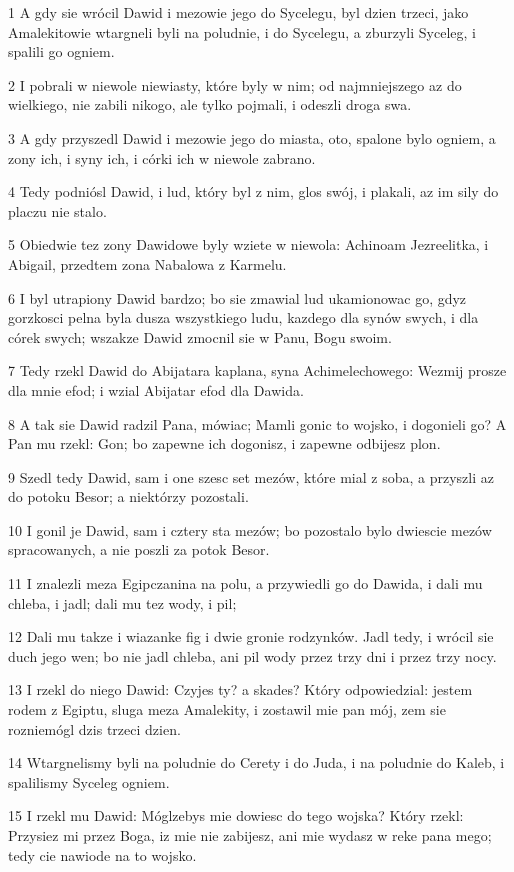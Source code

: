 \par 1 A gdy sie wrócil Dawid i mezowie jego do Sycelegu, byl dzien trzeci, jako Amalekitowie wtargneli byli na poludnie, i do Sycelegu, a zburzyli Syceleg, i spalili go ogniem.
\par 2 I pobrali w niewole niewiasty, które byly w nim; od najmniejszego az do wielkiego, nie zabili nikogo, ale tylko pojmali, i odeszli droga swa.
\par 3 A gdy przyszedl Dawid i mezowie jego do miasta, oto, spalone bylo ogniem, a zony ich, i syny ich, i córki ich w niewole zabrano.
\par 4 Tedy podniósl Dawid, i lud, który byl z nim, glos swój, i plakali, az im sily do placzu nie stalo.
\par 5 Obiedwie tez zony Dawidowe byly wziete w niewola: Achinoam Jezreelitka, i Abigail, przedtem zona Nabalowa z Karmelu.
\par 6 I byl utrapiony Dawid bardzo; bo sie zmawial lud ukamionowac go, gdyz gorzkosci pelna byla dusza wszystkiego ludu, kazdego dla synów swych, i dla córek swych; wszakze Dawid zmocnil sie w Panu, Bogu swoim.
\par 7 Tedy rzekl Dawid do Abijatara kaplana, syna Achimelechowego: Wezmij prosze dla mnie efod; i wzial Abijatar efod dla Dawida.
\par 8 A tak sie Dawid radzil Pana, mówiac; Mamli gonic to wojsko, i dogonieli go? A Pan mu rzekl: Gon; bo zapewne ich dogonisz, i zapewne odbijesz plon.
\par 9 Szedl tedy Dawid, sam i one szesc set mezów, które mial z soba, a przyszli az do potoku Besor; a niektórzy pozostali.
\par 10 I gonil je Dawid, sam i cztery sta mezów; bo pozostalo bylo dwiescie mezów spracowanych, a nie poszli za potok Besor.
\par 11 I znalezli meza Egipczanina na polu, a przywiedli go do Dawida, i dali mu chleba, i jadl; dali mu tez wody, i pil;
\par 12 Dali mu takze i wiazanke fig i dwie gronie rodzynków. Jadl tedy, i wrócil sie duch jego wen; bo nie jadl chleba, ani pil wody przez trzy dni i przez trzy nocy.
\par 13 I rzekl do niego Dawid: Czyjes ty? a skades? Który odpowiedzial: jestem rodem z Egiptu, sluga meza Amalekity, i zostawil mie pan mój, zem sie rozniemógl dzis trzeci dzien.
\par 14 Wtargnelismy byli na poludnie do Cerety i do Juda, i na poludnie do Kaleb, i spalilismy Syceleg ogniem.
\par 15 I rzekl mu Dawid: Móglzebys mie dowiesc do tego wojska? Który rzekl: Przysiez mi przez Boga, iz mie nie zabijesz, ani mie wydasz w reke pana mego; tedy cie nawiode na to wojsko.

